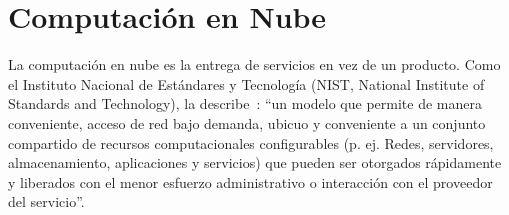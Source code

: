 \section{Computación en Nube}

La computación en nube es la entrega de servicios en vez de un producto. Como el Instituto Nacional de Estándares y Tecnología
(NIST, National Institute of Standards and Technology), la describe~\cite{mell2009nist}: ``un modelo que permite de manera 
conveniente, acceso de red bajo demanda, ubicuo y conveniente a un conjunto compartido de recursos computacionales configurables (p. ej. Redes,
servidores, almacenamiento, aplicaciones y servicios) que pueden ser otorgados rápidamente y liberados con el menor esfuerzo administrativo o
interacción con el proveedor del servicio''. 

